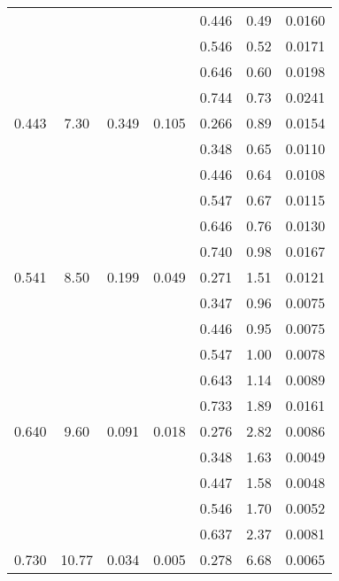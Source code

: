 \begin{table}[htbp]
\begin{center}
\begin{tabular}{|ccccc||c|c|}
         &          &          &          &    0.446 &      0.49 &    0.0160 \\
         &          &          &          &    0.546 &      0.52 &    0.0171 \\
         &          &          &          &    0.646 &      0.60 &    0.0198 \\
         &          &          &          &    0.744 &      0.73 &    0.0241 \\
   0.443 &    7.30 &   0.349 &    0.105 &    0.266 &      0.89 &    0.0154 \\
         &          &          &          &    0.348 &      0.65 &    0.0110 \\
         &          &          &          &    0.446 &      0.64 &    0.0108 \\
         &          &          &          &    0.547 &      0.67 &    0.0115 \\
         &          &          &          &    0.646 &      0.76 &    0.0130 \\
         &          &          &          &    0.740 &      0.98 &    0.0167 \\
   0.541 &    8.50 &   0.199 &    0.049 &    0.271 &      1.51 &    0.0121 \\
         &          &          &          &    0.347 &      0.96 &    0.0075 \\
         &          &          &          &    0.446 &      0.95 &    0.0075 \\
         &          &          &          &    0.547 &      1.00 &    0.0078 \\
         &          &          &          &    0.643 &      1.14 &    0.0089 \\
         &          &          &          &    0.733 &      1.89 &    0.0161 \\
   0.640 &    9.60 &   0.091 &    0.018 &    0.276 &      2.82 &    0.0086 \\
         &          &          &          &    0.348 &      1.63 &    0.0049 \\
         &          &          &          &    0.447 &      1.58 &    0.0048 \\
         &          &          &          &    0.546 &      1.70 &    0.0052 \\
         &          &          &          &    0.637 &      2.37 &    0.0081 \\
   0.730 &   10.77 &   0.034 &    0.005 &    0.278 &      6.68 &    0.0065 \\

\end{tabular}
\end{center}
\end{table}
